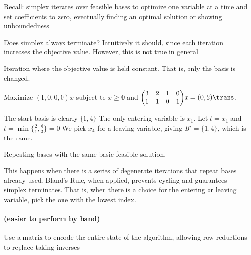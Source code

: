 Recall: simplex iterates over feasible bases to optimize one variable
at a time and set coefficients to zero, eventually finding an optimal
solution or showing unboundedness

Does simplex always terminate? Intuitively it should, since each
iteration increases the objective value. However, this is not true in
general

\begin{defn}
  Iteration where the objective value is held constant.
  That is, only the basis is changed.
\end{defn}

\begin{example}
  Maximize $(1,0,0,0)x$ subject to $x \geq \mathbb0$
  and $\mqty(3&2&1&0\\1&1&0&1)x = (0,2)\trans$.

  The start basis is clearly $\{1,4\}$
  The only entering variable is $x_1$. Let $t = x_1$ and
  $t = \min\{\frac21,\frac03\} = 0$
  We pick $x_4$ for a leaving variable, giving $B' = \{1,4\}$,
  which is the same.
\end{example}

\begin{defn}[cycling]
  Repeating bases with the same basic feasible solution.
\end{defn}

This happens when there is a series of degenerate iterations that repeat bases already used.
Bland's Rule, when applied, prevents cycling and guarantees simplex terminates.
That is, when there is a choice for the entering or leaving variable,
pick the one with the lowest index.

\paragraph{ \rm (easier to perform by hand)}
Use a matrix to encode the entire state of the algorithm, allowing
row reductions to replace taking inverses

